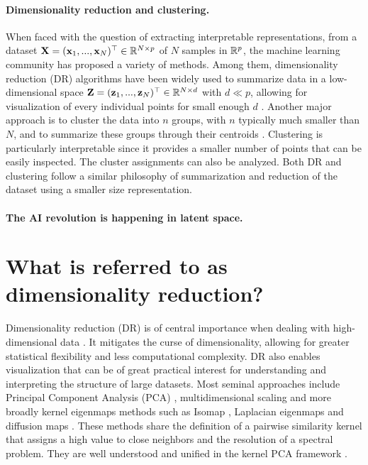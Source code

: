 \paragraph{Dimensionality reduction and clustering.}
When faced with the question of extracting
interpretable representations, from a dataset ${\mathbf{X}} = ({\mathbf{x}}_1, ..., {\mathbf{x}}_N) ^\top
\in \mathbb{R}^{N \times p}$ of $N$ samples in $\mathbb{R}^p$, the machine learning community
has proposed a variety of methods. Among them, dimensionality reduction (DR) algorithms have been widely used to summarize data in a low-dimensional space
${\mathbf{Z}} = ({\mathbf{z}}_1, ..., {\mathbf{z}}_N) ^\top \in \mathbb{R}^{N \times d}$ with $d \ll p$, allowing
for visualization of every individual points for small enough $d$ \citep{agrawal2021minimum,van2009dimensionality}.
Another major approach is to cluster the data into $n$ groups, with $n$
typically much smaller than $N$, and to summarize these groups through their centroids \citep{saxena2017review,ezugwu2022comprehensive}.
Clustering is particularly interpretable since it provides a
smaller number of points that can be easily inspected. %
The cluster assignments can also be analyzed. %
Both DR and clustering follow a
similar philosophy of summarization and reduction of the dataset using a smaller size representation.



\paragraph{The AI revolution is happening in latent space.}


\section{What is referred to as dimensionality reduction?}


Dimensionality reduction (DR) is of central importance when dealing with high-dimensional data \citep{donoho2000high}. It mitigates the curse of dimensionality, allowing for greater statistical flexibility and less computational complexity. DR also enables visualization that can be of great practical interest for understanding and interpreting the structure of large datasets.
Most seminal approaches include Principal Component Analysis (PCA) \citep{pearson1901liii},  multidimensional scaling \citep{kruskal1978multidimensional} and more broadly kernel eigenmaps methods such as Isomap \citep{balasubramanian2002isomap}, Laplacian eigenmaps \citep{belkin2003laplacian} and diffusion maps \citep{coifman2006diffusion}. These methods share the definition of a pairwise similarity kernel that assigns a high value to close neighbors and the resolution of a spectral problem. They are well understood and unified in the kernel PCA framework \citep{ham2004kernel}.

